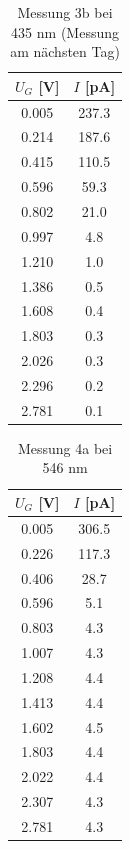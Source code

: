 \documentclass{article}
\begin{document}
\begin{table}[h!]
  \centering
  \begin{tabular}{|c|c|}
      \hline
      $U_G$ [V] & $I$ [pA] \\
      \hline
      0.005 & 237.3 \\
      0.214 & 187.6 \\
      0.415 & 110.5 \\
      0.596 & 59.3  \\
      0.802 & 21.0  \\
      0.997 & 4.8   \\
      1.210 & 1.0   \\
      1.386 & 0.5   \\
      1.608 & 0.4   \\
      1.803 & 0.3   \\
      2.026 & 0.3   \\
      2.296 & 0.2   \\
      2.781 & 0.1   \\
      \hline
  \end{tabular}
  \caption{Messung 3b bei 435 nm (Messung am nächsten Tag)}
  \label{tab:messung3b}
\end{table}
\begin{table}[h!]
  \centering
  \begin{tabular}{|c|c|}
      \hline
      $U_G$ [V] & $I$ [pA] \\
      \hline
      0.005 & 306.5 \\
      0.226 & 117.3 \\
      0.406 & 28.7  \\
      0.596 & 5.1   \\
      0.803 & 4.3   \\
      1.007 & 4.3   \\
      1.208 & 4.4   \\
      1.413 & 4.4   \\
      1.602 & 4.5   \\
      1.803 & 4.4   \\
      2.022 & 4.4   \\
      2.307 & 4.3   \\
      2.781 & 4.3   \\
      \hline
  \end{tabular}
  \caption{Messung 4a bei 546 nm}
  \label{tab:messung4a}
\end{table}
\end{document}
